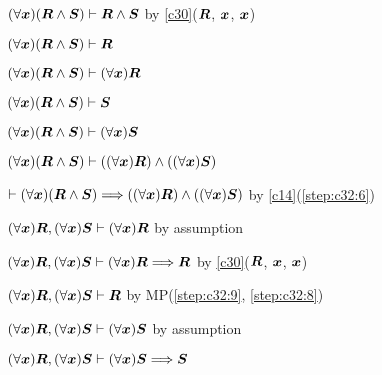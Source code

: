 \begin{pf}
\item\label{step:c32:1}\Pf $(\forall\boldsymbol{x})(\boldsymbol{R}\land\boldsymbol{S})\vdash\boldsymbol{R}\land\boldsymbol{S}$
by \ref{c30}($\boldsymbol{R}$, $\boldsymbol{x}$, $\boldsymbol{x}$)
\item\label{step:c32:2} $(\forall\boldsymbol{x})(\boldsymbol{R}\land\boldsymbol{S})\vdash\boldsymbol{R}$
\item\label{step:c32:3} $(\forall\boldsymbol{x})(\boldsymbol{R}\land\boldsymbol{S})\vdash(\forall\boldsymbol{x})\boldsymbol{R}$
\item\label{step:c32:4} $(\forall\boldsymbol{x})(\boldsymbol{R}\land\boldsymbol{S})\vdash\boldsymbol{S}$
\item\label{step:c32:5} $(\forall\boldsymbol{x})(\boldsymbol{R}\land\boldsymbol{S})\vdash(\forall\boldsymbol{x})\boldsymbol{S}$
\item\label{step:c32:6} $(\forall\boldsymbol{x})(\boldsymbol{R}\land\boldsymbol{S})\vdash((\forall\boldsymbol{x})\boldsymbol{R})\land((\forall\boldsymbol{x})\boldsymbol{S})$
\item\label{step:c32:7} $\vdash(\forall\boldsymbol{x})(\boldsymbol{R}\land\boldsymbol{S})\Longrightarrow((\forall\boldsymbol{x})\boldsymbol{R})\land((\forall\boldsymbol{x})\boldsymbol{S})$
by \ref{c14}(\ref{step:c32:6})
\item\label{step:c32:8} $(\forall\boldsymbol{x})\boldsymbol{R},(\forall\boldsymbol{x})\boldsymbol{S}\vdash(\forall\boldsymbol{x})\boldsymbol{R}$
by assumption
\item\label{step:c32:9} $(\forall\boldsymbol{x})\boldsymbol{R},(\forall\boldsymbol{x})\boldsymbol{S}\vdash(\forall\boldsymbol{x})\boldsymbol{R}\Longrightarrow\boldsymbol{R}$
by \ref{c30}($\boldsymbol{R}$, $\boldsymbol{x}$, $\boldsymbol{x}$)
\item\label{step:c32:10} $(\forall\boldsymbol{x})\boldsymbol{R},(\forall\boldsymbol{x})\boldsymbol{S}\vdash\boldsymbol{R}$
by MP(\ref{step:c32:9}, \ref{step:c32:8})
\item\label{step:c32:11} $(\forall\boldsymbol{x})\boldsymbol{R},(\forall\boldsymbol{x})\boldsymbol{S}\vdash(\forall\boldsymbol{x})\boldsymbol{S}$
by assumption
\item\label{step:c32:12} $(\forall\boldsymbol{x})\boldsymbol{R},(\forall\boldsymbol{x})\boldsymbol{S}\vdash(\forall\boldsymbol{x})\boldsymbol{S}\Longrightarrow\boldsymbol{S}$

\end{pf}
